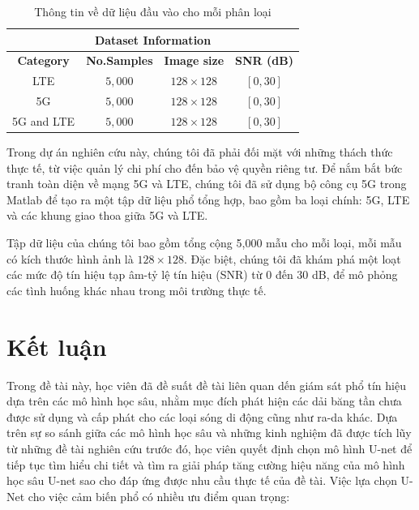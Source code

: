 \begin{table}[h]
\centering
\caption{Thông tin về dữ liệu đầu vào cho mỗi phân loại}
\label{tab2}
\begin{tabular}{c|c|c|c}
\hline
\hline
\multicolumn{4}{c}{\textbf{Dataset Information}} \\
\hline
\textbf{Category} & \textbf{No.Samples} & \textbf{Image size} & \textbf{SNR (dB)}\\
\hline
\hline
LTE         & $5,000$ & $128 \times 128$ & $[0, 30]$ \\
5G          & $5,000$ & $128 \times 128$ & $[0, 30]$ \\
5G and LTE  & $5,000$ & $128 \times 128$ & $[0, 30]$ \\
\hline
\hline
\end{tabular}
\end{table}

Trong dự án nghiên cứu này, chúng tôi đã phải đối mặt với những thách thức thực tế, từ việc quản lý chi phí cho đến bảo vệ quyền riêng tư. Để nắm bắt bức tranh toàn diện về mạng 5G và LTE, chúng tôi đã sử dụng bộ công cụ 5G trong Matlab để tạo ra một tập dữ liệu phổ tổng hợp, bao gồm ba loại chính: 5G, LTE và các khung giao thoa giữa 5G và LTE.

Tập dữ liệu của chúng tôi bao gồm tổng cộng 5,000 mẫu cho mỗi loại, mỗi mẫu có kích thước hình ảnh là $128 \times 128$. Đặc biệt, chúng tôi đã khám phá một loạt các mức độ tín hiệu tạp âm-tỷ lệ tín hiệu (SNR) từ $0$ đến $30$ dB, để mô phỏng các tình huống khác nhau trong môi trường thực tế.


\section{Kết luận}
Trong đề tài này, học viên đã đề suất đề tài liên quan dến giám sát phổ tín hiệu dựa trên các mô hình học sâu, nhằm mục đích phát hiện các dải băng tần chưa được sử dụng và cấp phát cho các loại sóng di động cũng như ra-da khác. Dựa trên sự so sánh giữa các mô hình học sâu và những kinh nghiệm đã được tích lũy từ những đề tài nghiên cứu trước đó, học viên quyết định chọn mô hình U-net để tiếp tục tìm hiểu chi tiết và tìm ra giải pháp tăng cường hiệu năng của mô hình học sâu U-net sao cho đáp ứng được nhu cầu thực tế của đề tài. Việc lựa chọn U-Net cho việc cảm biến phổ có nhiều ưu điểm quan trọng:

